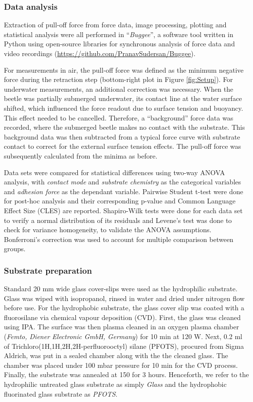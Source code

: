 \documentclass[vruler,JEB]{COB}%
\begin{document}
\subsubsection{Data analysis}

Extraction of pull-off force from force data, image processing, plotting
and statistical analysis were all performed in ``\emph{Buggee}'',
a software tool written in Python using open-source libraries for synchronous
analysis of force data and video recordings (\url{https://github.com/PranavSudersan/Buggee}). 

For measurements in air, the pull-off force was defined as the minimum
negative force during the retraction step (bottom-right plot in Figure \ref{fig:Setup}).
For underwater measurements, an additional correction was necessary.
When the beetle was partially submerged underwater, its contact line at the
water surface shifted, which influenced the force readout due to surface
tension and buoyancy. This effect needed to be cancelled. Therefore, a ``background''
force data was recorded, where the submerged beetle makes no contact
with the substrate. This background data was then subtracted from
a typical force curve with substrate contact to correct for the external
surface tension effects. The pull-off force was subsequently calculated
from the minima as before. 

Data sets were compared for statistical differences using two-way ANOVA analysis, with \emph{contact mode} and \emph{substrate chemistry} as the categorical variables and \emph{adhesion force} as the dependant variable. Pairwise
Student t-test were done for post-hoc analysis and their corresponding p-value and Common Language
Effect Size (CLES) are reported. Shapiro-Wilk tests were done for each
data set to verify a normal distribution of its residuals and Levene's
test was done to check for variance homogeneity, to validate the ANOVA 
assumptions. Bonferroni's correction was used to account for multiple
comparison between groups.

\subsubsection{Substrate preparation}

Standard 20 mm wide glass cover-slips were used as the hydrophilic
substrate. Glass was wiped with isopropanol, rinsed in water and dried
under nitrogen flow before use. For the hydrophobic substrate, the glass cover slip was coated with
a fluorosilane via chemical vapour deposition (CVD). First, the glass
was cleaned using IPA. The surface was then plasma cleaned in an oxygen
plasma chamber (\emph{Femto, Diener Electronic GmbH, Germany}) for 10 min at 120 W. Next, 0.2 ml of
Trichloro(1H,1H,2H,2H-perfluorooctyl) silane (PFOTS), procured from
Sigma Aldrich, was put in a sealed chamber along with the the cleaned
glass. The chamber was placed under 100 mbar pressure for 10 min for
the CVD process. Finally, the substrate was annealed at 150 \textcelsius{}
for 3 hours. Henceforth, we refer to the hydrophilic untreated glass substrate 
as simply \emph{Glass} and the hydrophobic fluorinated glass substrate as \emph{PFOTS}.
\end{document}
